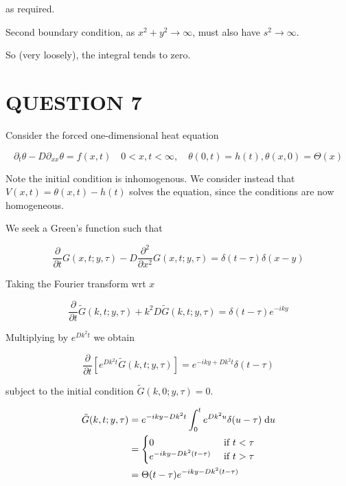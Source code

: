 \documentclass[a4paper]{article}
\begin{document}
as required.

Second boundary condition, as $ x^{2} + y^{2} \to \infty $, must also have $ s^{2} \to \infty $.

So (very loosely), the integral tends to zero. 









\section{QUESTION 7}

Consider the forced one-dimensional heat equation

\[ \partial_{t} \theta - D \partial_{xx} \theta = f(x,t) \quad 0 < x,t < \infty, \quad \theta(0,t) = h(t), \theta(x,0) = \Theta(x)  \]

Note the initial condition is inhomogenous. We consider instead that $ V(x,t) = \theta(x,t) - h(t) $ solves the equation, since the conditions are now homogeneous.

We seek a Green's function such that

\[ \frac{\partial }{\partial t}G(x,t ; y,\tau) - D \frac{\partial^{2} }{\partial x^{2}} G(x,t ; y,\tau) = \delta(t - \tau) \delta(x-y) \]

Taking the Fourier transform wrt $ x $ 

\[ \frac{\partial }{\partial t}\tilde{G}(k,t ; y,\tau) + k^{2} D \tilde{G}(k,t ; y,\tau) = \delta(t - \tau) e^{-iky}\]

Multiplying by $ e^{Dk^{2}t} $ we obtain

\[ \frac{\partial }{\partial t} \left[  e^{Dk^{2}t} \tilde{G}(k,t ; y,\tau)  \right] = e^{-iky + Dk^{2}t} \delta(t - \tau)  \]

subject to the initial condition $ \tilde{G}(k,0 ; y,\tau) = 0 $.

\begin{align*}
\tilde{G}(k,t ; y,\tau)  & =  e^{-iky - Dk^{2}t} \int_{0}^{t} e^{Dk^{2}u} \delta(u - \tau) \; \mathrm{d} u   \\
& = \begin{cases}  0  & \text{ if } t < \tau \\ e^{-iky - Dk^{2}(t-\tau)} & \text{ if } t > \tau \end{cases} \\
& = \Theta(t - \tau) e^{-iky - Dk^{2}(t-\tau)}
\end{align*}
\end{document}
